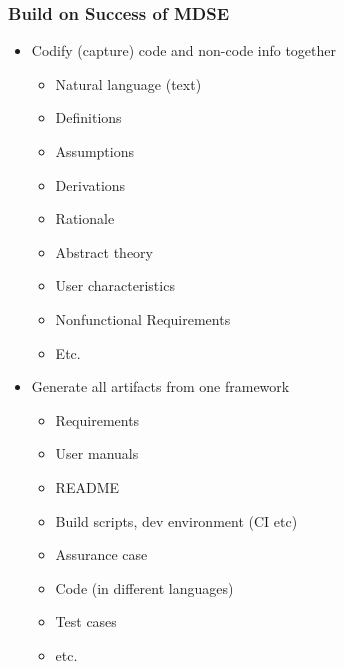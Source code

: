 \documentclass[usenames]{beamer}
\begin{document}
\begin{frame}

\frametitle{Build on Success of MDSE}

\begin{itemize}
  \item Codify (capture) code and non-code info together
  \begin{itemize}
    \item Natural language (text)
    \item Definitions
    \item Assumptions
    \item Derivations
    \item Rationale
    \item Abstract theory
    \item User characteristics
    \item Nonfunctional Requirements
    \item Etc.
  \end{itemize}
\item Generate all artifacts from one framework
\begin{itemize}
  \item Requirements
  \item User manuals
  \item README
  \item Build scripts, dev environment (CI etc)
  \item Assurance case
  \item Code (in different languages)
  \item Test cases
  \item etc.
\end{itemize}
\end{itemize}

\end{frame}
\end{document}
